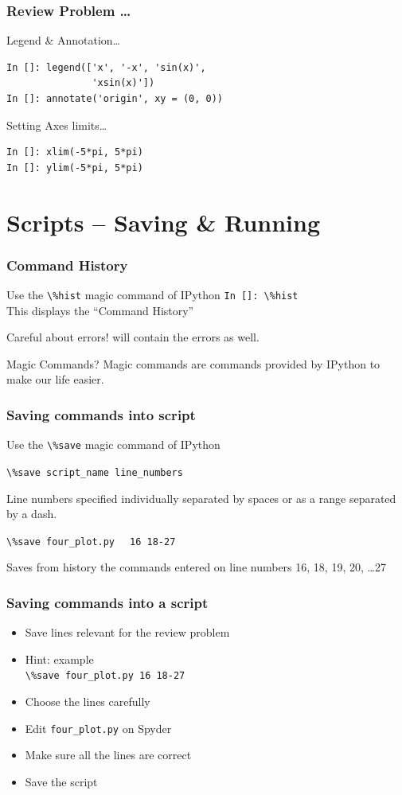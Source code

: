 \documentclass[14pt,compress]{beamer}
\newcounter{time}
\newcommand{\inctime}[1]{\addtocounter{time}{#1}{\tiny \thetime\ m}}
\newcommand{\typ}[1]{\lstinline{#1}}
\newcommand{\kwrd}[1]{ \texttt{\textbf{\color{blue}{#1}}}  }
\begin{document}
\begin{frame}[fragile]
\frametitle{Review Problem \ldots}
\alert{Legend \& Annotation\ldots}
\begin{lstlisting}
In []: legend(['x', '-x', 'sin(x)',
               'xsin(x)'])
In []: annotate('origin', xy = (0, 0))
\end{lstlisting}
\alert{Setting Axes limits\ldots}
\begin{lstlisting}
In []: xlim(-5*pi, 5*pi)
In []: ylim(-5*pi, 5*pi)
\end{lstlisting}
\inctime{5}
\end{frame}

\section{Scripts -- Saving \& Running}
\begin{frame}[fragile]
\frametitle{Command History}
Use the \typ{\%hist} \alert{magic} command of IPython
\typ{In []: \%hist}\\
This displays the ``Command History''
\begin{block}{Careful about errors!}
  \kwrd{\%hist} will contain the errors as well.\\
\end{block}
\pause
\begin{block}{Magic Commands?}
  Magic commands are commands provided by IPython to make our life easier.
\end{block}
\end{frame}

\begin{frame}[fragile]
  \frametitle{Saving commands into script}
Use the \typ{\%save} \alert{magic} command of IPython
\begin{block}{}
\typ{\%save script_name line_numbers}
\end{block}
Line numbers specified individually separated by spaces or as a range separated by a dash.\\
\begin{block}{}
\typ{\%save four_plot.py} \alert{\typ{  16 18-27}} \\
\end{block}
Saves from history the commands entered on line numbers \alert{16, 18, 19, 20, \ldots 27}
\end{frame}

\begin{frame}[fragile]
  \frametitle{Saving commands into a script}
  \begin{itemize}
  \item Save lines relevant for the review problem
  \item Hint: example\\ \typ{\%save four_plot.py 16 18-27}
  \item Choose the lines carefully
  \item Edit \typ{four_plot.py} on Spyder
  \item Make sure all the lines are correct
  \item Save the script
  \end{itemize}
\inctime{5}
\end{frame}
\end{document}
